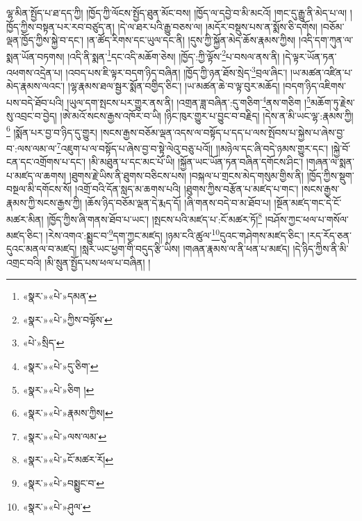ལྷ་མིན་སྤྱོད་པ་ཐ་དད་ཀྱི། །ཁྱོད་ཀྱི་ལོངས་སྤྱོད་ཐུན་མོང་བས། །ཁྱོད་ལ་དབྱེ་བ་མི་མངའོ། །གང་དུ་རྒྱུ་ནི་མེད་པ་ལ། །ཁྱོད་ཀྱིས་བསྟན་པར་རབ་བཙུད་ན། །དེ་ལ་ཐར་པའི་རྒྱུ་བཅས་ལ། །མདོར་བསྡུས་པས་ན་སྨོས་ཅི་དགོས། །བཅོམ་ལྡན་ཁྱོད་ཀྱིས་སྐྱེ་བ་དང་། །ན་ཚོད་རིགས་དང་ཡུལ་དང་ནི། །དུས་ཀྱི་སྐྱོན་མེད་ཆོས་རྣམས་ཀྱིས། །འདི་དག་ཀུན་ལ་སྨན་ཡོན་བཏགས། །འདི་ནི་སྨན་\footnote{«སྣར་»«པེ་»དམན་}དང་འདི་མཆོག་ཅེས། །ཁྱོད་:ཀྱི་ལྟོས་\footnote{«སྣར་»«པེ་»ཀྱིས་བལྟོས་}པ་བསལ་ནས་ནི། །དེ་ལྟར་ཡོན་ཏན་འཕགས་འདྲེན་པ། །འབད་པས་ཇི་ལྟར་བདག་ཉིད་བཞིན། །ཁྱོད་ཀྱི་ཉན་ཐོས་སྲེད་\footnote{«པེ་»སྲིད་}བྲལ་ཞིང་། །ཡ་མཚན་འཛིན་པ་མེད་རྣམས་ལའང་། །ལྷ་རྣམས་ཐལ་སྦྱར་སྨོན་བགྱིད་ཅིང་། །ཡ་མཚན་ཆེ་བ་ལྟ་བུར་མཆོད། །བདག་ཉིད་འཇིགས་པས་བདེ་ཐོབ་པའི། །ཡུལ་དག་སྤངས་པར་གྱུར་ནས་ནི། །འགྲན་ཟླ་བཞིན་:དུ་གཅིག་\footnote{«སྣར་»«པེ་»དུ་ཅིག་}ནས་གཅིག །\footnote{«སྣར་»«པེ་»ཅིག །}མཆོག་ཏུ་རྗེས་སུ་འབྲང་བ་བྱེད། །ཨེ་མའོ་སངས་རྒྱས་འཁོར་བ་ཡི། །ཉིང་ཁུར་གྱུར་པ་བྱུང་བ་བརྗིད། །དེས་ན་མི་ཡང་ལྷ་:རྣམས་ཀྱི།\footnote{«སྣར་»«པེ་»རྣམས་ཀྱིས།} །སྨོན་པར་བྱ་བ་ཉིད་དུ་གྱུར། །སངས་རྒྱས་བཅོམ་ལྡན་འདས་ལ་བསྟོད་པ་དད་པ་ལས་སྤོབས་པ་སྐྱེས་པ་ཞེས་བྱ་བ་:ལས་ལམ་ལ་\footnote{«སྣར་»«པེ་»ལས་ལམ་}འཇུག་པ་ལ་བསྟོད་པ་ཞེས་བྱ་བ་སྟེ་ལེའུ་བཅུ་པའོ།། །།མཉེལ་དང་ཞི་བདེ་ཉམས་གྱུར་དང་། །སྐྱེ་བོ་ངན་དང་འགྲོགས་པ་དང་། །མི་མཐུན་པ་དང་མང་པོ་ཡི། །སྐྱོན་ཡང་ཡོན་ཏན་བཞིན་དགོངས་ཤིང་། །གཞན་ལ་སྨན་པ་མཛད་ལ་ཆགས། །ཐུགས་རྗེ་ཡིས་ནི་ཐུགས་བཅིངས་པས། །བསྐལ་པ་གྲངས་མེད་གསུམ་གྱིས་ནི། །ཁྱོད་ཀྱིས་སྡུག་བསྔལ་མི་དགོངས་སོ། །འགྲོ་བའི་དོན་སླད་མ་ཆགས་པའི། །ཐུགས་ཀྱིས་བརྩོན་པ་མཛད་པ་གང་། །སངས་རྒྱས་རྣམས་ཀྱི་སངས་རྒྱས་ཀྱི། །ཆོས་ཉིད་བཅོམ་ལྡན་དེ་རྨད་དོ། །ཞི་གནས་བདེ་བ་མ་ཐོབ་པ། །སྔོན་མཛད་གང་དེ་ངོ་མཚར་མིན། །ཁྱོད་ཀྱིས་ཞི་གནས་ཐོབ་པ་ཡང་། །སྤངས་པའི་མཛད་པ་:ངོ་མཚར་ཏོ།\footnote{«སྣར་»«པེ་»ངོ་མཚར་རོ།} །བཤོས་ཀྱང་ཕལ་པ་གསོལ་མཛད་ཅིང་། །རེས་འགའ་:སྨྱུང་བ་\footnote{«སྣར་»«པེ་»བསྨྱུང་བ་}དག་ཀྱང་མཛད། །ཉམ་ངའི་ཚུལ་\footnote{«སྣར་»«པེ་»ཤུལ་}དུའང་གཤེགས་མཛད་ཅིང་། །རད་རོད་ཅན་དུའང་མནལ་བ་མཛད། །སླར་ཡང་ཕྱག་གི་བདུད་རྩི་ཡིས། །གཞན་རྣམས་ལ་ནི་ཕན་པ་མཛད། །དེ་ཉིད་ཀྱིས་ནི་མི་འགྲང་བའི། །མི་སྲུན་སྤྱོད་པས་ཕལ་པ་བཞིན། །
